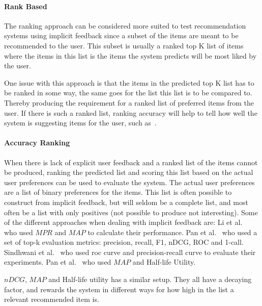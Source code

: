 \paragraph{Rank Based}
\label{par:Ranking_based}

The ranking approach can be considered more suited to test recommendation
systems using implicit feedback since a subset of the items are meant to be
recommended to the user.  This subset is usually a ranked top K list of items
where the items in this list is the items the system predicts will be most
liked by the user.

One issue with this approach is that the items in the predicted top K list has
to be ranked in some way, the same goes for the list this list is to be
compared to.  Thereby producing the requirement for a ranked list of preferred
items from the user.  If there is such a ranked list, ranking accuracy will
help to tell how well the system is suggesting items for the user, such
as~\cite{Yilmaz:2008:NRC:1390334.1390435}.


\paragraph{Accuracy Ranking}
\label{par:usage_prediction}

When there is lack of explicit user feedback and a ranked list of the items
cannot be produced, ranking the predicted list and scoring this list based on
the actual user preferences can be used to evaluate the system.  The actual
user preferences are a list of binary preferences for the items.  This list is
often possible to construct from implicit feedback, but will seldom be a
complete list, and most often be a list with only positives (not possible to
produce not interesting).  Some of the different approaches when dealing with
implicit feedback are: Li et al.~\cite{deLace2010} who used $MPR$ and $MAP$ to
calculate their performance.  Pan et al.~\cite{Pan:2013:GGP:2540128.2540516}
who used a set of top-k evaluation metrics: precision, recall, F1, nDCG, ROC
and 1-call.  Sindhwani et al.~\cite{Sindhwani:2010:OMC:1933307.1934641} who
used roc curve and precision-recall curve to evaluate their experiments.  Pan
et al.~\cite{pan2008} who used $MAP$ and Half-life Utility.

$nDCG$, $MAP$ and Half-life utility has a similar setup.  They all have a
decaying factor, and rewards the system in different ways for how high in the
list a relevant recommended item is.


